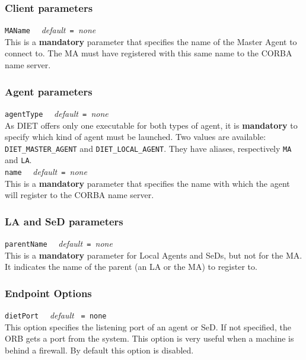 \subsubsection{Client parameters}

\noindent
\texttt{MAName} \ \ \emph{default}\texttt{ = }\emph{none}\\ This is a
\textbf{mandatory} parameter that specifies the name of the Master
Agent to connect to. The MA must have registered with this same name
to the CORBA name server.


\subsubsection{Agent parameters}

\noindent
\texttt{agentType} \ \ \emph{default}\texttt{ = }\emph{none}\\
As DIET offers only one executable for both types of agent, it is
\textbf{mandatory} to specify which kind of agent must be launched. Two values
are available: \texttt{DIET\_MASTER\_AGENT} and \texttt{DIET\_LOCAL\_AGENT}.
They have aliases, respectively \texttt{MA} and \texttt{LA}.
\\

\noindent
\texttt{name} \ \ \emph{default}\texttt{ = }\emph{none}\\ This is a
\textbf{mandatory} parameter that specifies the name with which the
agent will register to the CORBA name server.


\subsubsection{LA and SeD parameters}

\noindent
\texttt{parentName} \ \ \emph{default}\texttt{ = }\emph{none}\\ This
is a \textbf{mandatory} parameter for Local Agents and SeDs, but 
not for the MA.  It indicates the name of the parent (an LA or the
MA) to register to.

\subsubsection{Endpoint Options}

\noindent
\texttt{dietPort} \ \ \emph{default} \texttt{ = none }\\ This
option specifies the listening port of an agent or SeD. If not
specified, the ORB gets a port from the system. This option is very
useful when a machine is behind a firewall. By default this option
is disabled.\\


